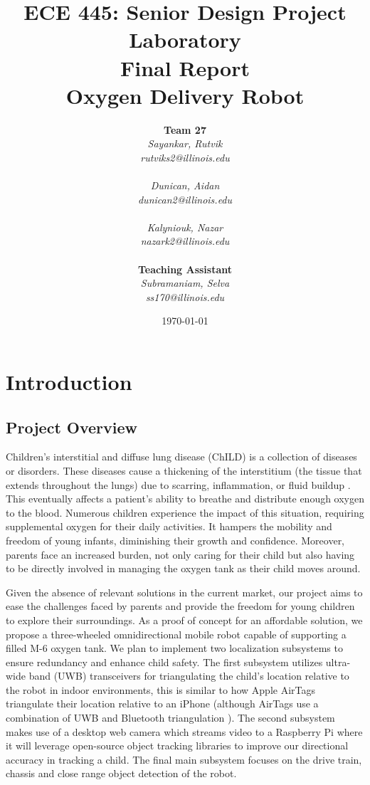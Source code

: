 \documentclass{report}
\title{ECE 445: Senior Design Project Laboratory \\ Final Report \\ Oxygen Delivery Robot} %
\author {
    \textbf{Team 27} \\ 
    \textit{Sayankar, Rutvik}\\
    \textit{rutviks2@illinois.edu} \\
    \hfill \\ 
    \textit{Dunican, Aidan}\\
    \textit{dunican2@illinois.edu} \\
    \hfill \\ 
    \textit{Kalyniouk, Nazar}\\
    \textit{nazark2@illinois.edu} \\
    \hfill \\ 
    \textbf{Teaching Assistant} \\ 
    \textit{Subramaniam, Selva} \\
    \textit{ss170@illinois.edu} 
}
\date{\today} %
\begin{document}
    \maketitle %

    \begin{abstract}
        
    \end{abstract}
    
    \pagebreak
    \tableofcontents %
    \pagebreak

    \chapter{Introduction}
    \section{Project Overview}
    Children's interstitial and diffuse lung disease (ChILD) is a collection of diseases or disorders. These diseases cause a thickening of the interstitium (the tissue that extends throughout the lungs) due to scarring, inflammation, or fluid buildup \cite{ChILD-2022}. This eventually affects a patient’s ability to breathe and distribute enough oxygen to the blood. Numerous children experience the impact of this situation, requiring supplemental oxygen for their daily activities. It hampers the mobility and freedom of young infants, diminishing their growth and confidence. Moreover, parents face an increased burden, not only caring for their child but also having to be directly involved in managing the oxygen tank as their child moves around.

    Given the absence of relevant solutions in the current market, our project aims to ease the challenges faced by parents and provide the freedom for young children to explore their surroundings. As a proof of concept for an affordable solution, we propose a three-wheeled omnidirectional mobile robot capable of supporting a filled M-6 oxygen tank. We plan to implement two localization subsystems to ensure redundancy and enhance child safety. The first subsystem utilizes ultra-wide band (UWB) transceivers for triangulating the child's location relative to the robot in indoor environments, this is similar to how Apple AirTags triangulate their location relative to an iPhone \cite{airtag_uwb} (although AirTags use a combination of UWB and Bluetooth triangulation \cite{airtag_ble}). The second subsystem makes use of a desktop web camera which streams video to a Raspberry Pi where it will leverage open-source object tracking libraries to improve our directional accuracy in tracking a child. The final main subsystem focuses on the drive train, chassis and close range object detection of the robot.
\end{document}
